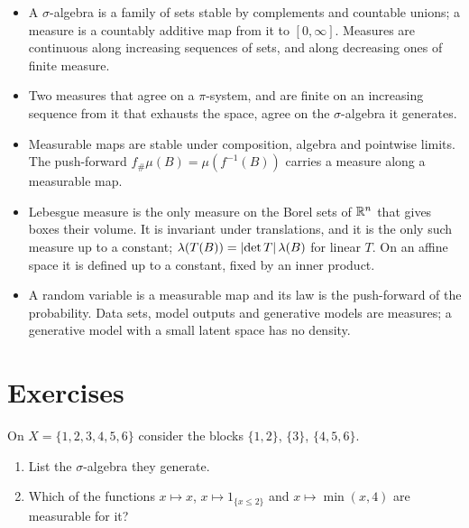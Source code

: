 \begin{notechapter}
\begin{chaptersummary}
\begin{itemize}[nosep]
  \item A $\sigma$-algebra is a family of sets stable by complements and
        countable unions; a measure is a countably additive map from it
        to $[0, \infty]$. Measures are continuous along increasing
        sequences of sets, and along decreasing ones of finite measure.
  \item Two measures that agree on a $\pi$-system, and are finite on an
        increasing sequence from it that exhausts the space, agree on
        the $\sigma$-algebra it generates.
  \item Measurable maps are stable under composition, algebra and
        pointwise limits. The push-forward
        $f_\#\mu(B) = \mu(f^{-1}(B))$ carries a measure along a
        measurable map.
  \item Lebesgue measure is the only measure on the Borel sets of
        $\mathbb{R}^n$ that gives boxes their volume. It is invariant under
        translations, and it is the only such measure up to a constant;
        $\lambda(T(B)) = \left|\det T\right|\lambda(B)$ for linear $T$. On an
        affine space it is defined up to a constant, fixed by an inner
        product.
  \item A random variable is a measurable map and its law is the
        push-forward of the probability. Data sets, model outputs and
        generative models are measures; a generative model with a small
        latent space has no density.
\end{itemize}
\end{chaptersummary}

\section*{Exercises}

\begin{exercise}\label{measures:exr:1}
On $X = \{1, 2, 3, 4, 5, 6\}$ consider the blocks $\{1, 2\}$, $\{3\}$,
$\{4, 5, 6\}$.
\begin{enumerate}[nosep]
  \item List the $\sigma$-algebra they generate.
  \item Which of the functions $x\mapsto x$, $x\mapsto1_{\{x\leq2\}}$
        and $x\mapsto\min(x, 4)$ are measurable for it?
\end{enumerate}
\end{exercise}


\end{notechapter}
